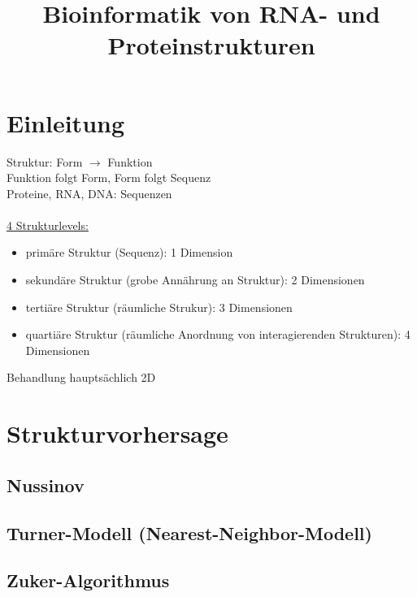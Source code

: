 \documentclass[12pt]{article}
\title{\Huge\textbf{Bioinformatik von RNA- und Proteinstrukturen}}
\author{}
\date{}
\begin{document}
\begin{titlepage}

\maketitle
\thispagestyle{empty}
\end{titlepage}
\newpage

\begin{titlepage}
\tableofcontents
\thispagestyle{empty}
\end{titlepage}
\newpage

\section{Einleitung}

Struktur: Form $\rightarrow$ Funktion\\
Funktion folgt Form, Form folgt Sequenz\\
Proteine, RNA, DNA: Sequenzen\\
\\
\underline{4 Strukturlevels:}
\begin{itemize}
	\item primäre Struktur (Sequenz): 1 Dimension
	\item sekundäre Struktur (grobe Annährung an Struktur): 2 Dimensionen
	\item tertiäre Struktur (räumliche Strukur): 3 Dimensionen
	\item quartiäre Struktur (räumliche Anordnung von interagierenden Strukturen): 4 Dimensionen
\end{itemize}
%
Behandlung hauptsächlich 2D

\section{Strukturvorhersage}

\subsection{Nussinov}

\subsection{Turner-Modell (Nearest-Neighbor-Modell)}

\subsection{Zuker-Algorithmus}
\end{document}
